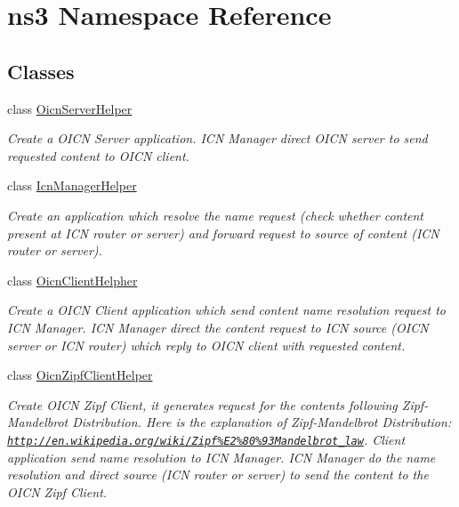 \hypertarget{namespacens3}{\section{ns3 Namespace Reference}
\label{namespacens3}
}
\subsection*{Classes}
\begin{DoxyCompactItemize}
\item 
class \hyperlink{classns3_1_1OicnServerHelper}{Oicn\-Server\-Helper}
\begin{DoxyCompactList}\small\item\em Create a O\-I\-C\-N Server application. I\-C\-N Manager direct O\-I\-C\-N server to send requested content to O\-I\-C\-N client. \end{DoxyCompactList}\item 
class \hyperlink{classns3_1_1IcnManagerHelper}{Icn\-Manager\-Helper}
\begin{DoxyCompactList}\small\item\em Create an application which resolve the name request (check whether content present at I\-C\-N router or server) and forward request to source of content (I\-C\-N router or server). \end{DoxyCompactList}\item 
class \hyperlink{classns3_1_1OicnClientHelpher}{Oicn\-Client\-Helpher}
\begin{DoxyCompactList}\small\item\em Create a O\-I\-C\-N Client application which send content name resolution request to I\-C\-N Manager. I\-C\-N Manager direct the content request to I\-C\-N source (O\-I\-C\-N server or I\-C\-N router) which reply to O\-I\-C\-N client with requested content. \end{DoxyCompactList}\item 
class \hyperlink{classns3_1_1OicnZipfClientHelper}{Oicn\-Zipf\-Client\-Helper}
\begin{DoxyCompactList}\small\item\em Create O\-I\-C\-N Zipf Client, it generates request for the contents following Zipf-\/\-Mandelbrot Distribution. Here is the explanation of Zipf-\/\-Mandelbrot Distribution\-: \href{http://en.wikipedia.org/wiki/Zipf%E2%80%93Mandelbrot_law}{\tt http\-://en.\-wikipedia.\-org/wiki/\-Zipf\%\-E2\%80\%93\-Mandelbrot\-\_\-law}. Client application send name resolution to I\-C\-N Manager. I\-C\-N Manager do the name resolution and direct source (I\-C\-N router or server) to send the content to the O\-I\-C\-N Zipf Client. \end{DoxyCompactList}\item 

\end{DoxyCompactItemize}
